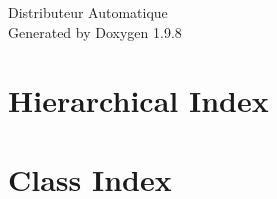 \documentclass[twoside]{book}
\newcommand{\+}{\discretionary{\mbox{\scriptsize$\hookleftarrow$}}{}{}}
\newcommand{\clearemptydoublepage}{%
    \newpage{\pagestyle{empty}\cleardoublepage}%
  }
\begin{document}
  \raggedbottom
    \hypersetup{pageanchor=false,
                bookmarksnumbered=true,
                pdfencoding=unicode
               }
  \begin{titlepage}
  \vspace*{7cm}
  \begin{center}%
  {\Large Distributeur Automatique}\\
  \vspace*{1cm}
  {\large Generated by Doxygen 1.9.8}\\
  \end{center}
  \end{titlepage}
  \clearemptydoublepage
  \tableofcontents
  \clearemptydoublepage
  \hypersetup{pageanchor=true}
\chapter{Hierarchical Index}

\chapter{Class Index}

\end{document}
